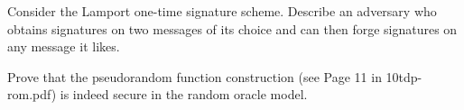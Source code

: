 \documentclass[12pt,letterpaper,boxed]{amspset}
\begin{document}
\begin{problem}[12.3]
Consider the Lamport one-time signature scheme. Describe an adversary who obtains signatures on two messages of its choice and can then forge signatures on any message it likes.
\end{problem}

\begin{solution}
\vspace{4cm}
\end{solution}

\begin{problem}[13.1]
Prove that the pseudorandom function construction (see Page 11 in 10tdp-rom.pdf) is indeed secure in the random oracle model.
\end{problem}

\begin{solution}
\vspace{6cm}

\end{solution}
\end{document}
